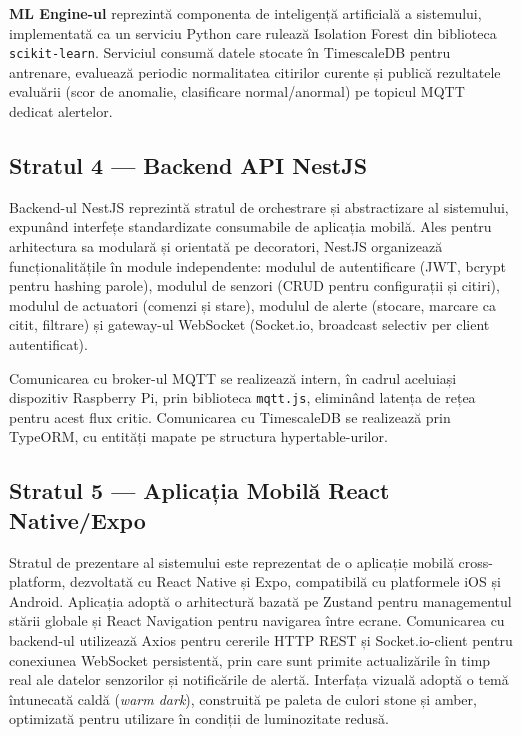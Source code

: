\documentclass[12pt, twoside, a4paper]{report}
\begin{document}
\textbf{ML Engine-ul} reprezintă componenta de inteligență artificială a sistemului,
implementată ca un serviciu Python care rulează Isolation Forest din biblioteca
\texttt{scikit-learn}. Serviciul consumă datele stocate în TimescaleDB pentru antrenare,
evaluează periodic normalitatea citirilor curente și publică rezultatele evaluării
(scor de anomalie, clasificare normal/anormal) pe topicul MQTT dedicat alertelor.

\subsection{Stratul 4 --- Backend API NestJS}

Backend-ul NestJS reprezintă stratul de orchestrare și abstractizare al sistemului,
expunând interfețe standardizate consumabile de aplicația mobilă. Ales pentru
arhitectura sa modulară și orientată pe decoratori, NestJS organizează funcționalitățile
în module independente: modulul de autentificare (JWT, bcrypt pentru hashing parole),
modulul de senzori (CRUD pentru configurații și citiri), modulul de actuatori (comenzi
și stare), modulul de alerte (stocare, marcare ca citit, filtrare) și gateway-ul
WebSocket (Socket.io, broadcast selectiv per client autentificat).

Comunicarea cu broker-ul MQTT se realizează intern, în cadrul aceluiași dispozitiv
Raspberry Pi, prin biblioteca \texttt{mqtt.js}, eliminând latența de rețea pentru
acest flux critic. Comunicarea cu TimescaleDB se realizează prin TypeORM, cu entități
mapate pe structura hypertable-urilor.

\subsection{Stratul 5 --- Aplicația Mobilă React Native/Expo}

Stratul de prezentare al sistemului este reprezentat de o aplicație mobilă
cross-platform, dezvoltată cu React Native și Expo, compatibilă cu platformele iOS
și Android. Aplicația adoptă o arhitectură bazată pe Zustand pentru managementul stării
globale și React Navigation pentru navigarea între ecrane. Comunicarea cu backend-ul
utilizează Axios pentru cererile HTTP REST și Socket.io-client pentru conexiunea
WebSocket persistentă, prin care sunt primite actualizările în timp real ale datelor
senzorilor și notificările de alertă. Interfața vizuală adoptă o temă întunecată caldă
(\textit{warm dark}), construită pe paleta de culori stone și amber, optimizată pentru
utilizare în condiții de luminozitate redusă.
\end{document}
